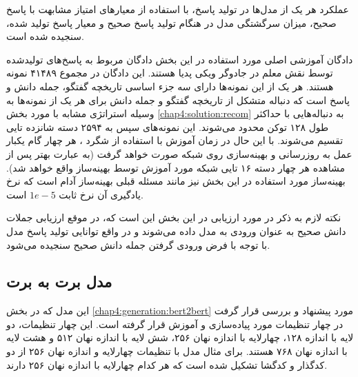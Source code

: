 عملکرد هر یک از مدل‌ها در تولید پاسخ، با استفاده از معیار‌های امتیاز مشابهت
با پاسخ صحیح، میزان سرگشتگی مدل در هنگام تولید پاسخ صحیح و معیار
پاسخ تولید شده، سنجیده شده است.

دادگان آموزشی اصلی مورد استفاده در این بخش دادگان  مربوط به پاسخ‌های تولیدشده توسط نقش معلم در جادوگر ویکی پدیا هستند. این دادگان در مجموع ۴۱۴۸۹ نمونه هستند. هر یک از این نمونه‌ها دارای سه جزء اساسی تاریخچه گفتگو، جمله دانش و پاسخ است که دنباله متشکل از تاریخچه گفتگو و جمله دانش برای هر یک از نمونه‌ها به وسیله استراتژی مشابه با مورد بخش
\ref{chap4:solution:recom}
به دنباله‌هایی با حداکثر طول ۱۲۸ توکن محدود می‌شوند. این نمونه‌های سپس به ۲۵۹۴ دسته شانزده تایی تقسیم می‌شوند. با این حال در زمان آموزش با استفاده از شگرد 
، هر چهار گام یکبار عمل به روزرسانی و بهینه‌سازی روی شبکه صورت خواهد گرفت (به عبارت بهتر پس از مشاهده هر چهار دسته ۱۶ تایی شبکه مورد آموزش توسط بهینه‌ساز واقع خواهد شد). بهینه‌ساز مورد استفاده در این بخش نیز مانند مسئله قبلی بهینه‌ساز آدام است که نرخ یادگیری آن نرخ ثابت 
$1e-5$
است. 

نکته لازم به ذکر در مورد ارزیابی در این بخش این است که، در موقع ارزیابی جملات دانش صحیح به عنوان ورودی به مدل داده‌ می‌شوند و در واقع توانایی تولید پاسخ مدل با توجه با فرض ورودی گرفتن جمله دانش صحیح سنجیده می‌شود. 

\subsection{مدل برت به برت}
این مدل که در بخش 
\ref{chap4:generation:bert2bert}
مورد پیشنهاد و بررسی قرار گرفت در چهار تنظیمات مورد پیاده‌سازی و آموزش قرار گرفته است. این چهار تنظیمات، دو لایه با اندازه ۱۲۸، چهارلایه با اندازه نهان ۲۵۶، شش لایه با اندازه نهان ۵۱۲ و هشت لایه با اندازه نهان ۷۶۸ هستند. برای مثال مدل با تنظیمات چهارلایه و اندازه نهان ۲۵۶ از دو کدگذار و کدگشا تشکیل شده است که هر کدام چهارلایه با اندازه نهان ۲۵۶ دارند. 

